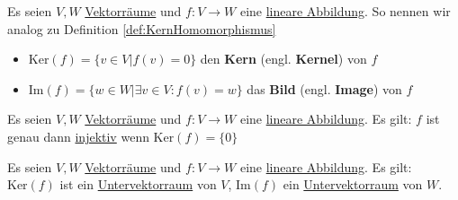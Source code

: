 \documentclass[../../main.tex]{subfiles}
\begin{document}
	\begin{definition}
		\label{def:KernelLineareAbbildung}
		\label{def:KernLineareAbbildung}
		\label{def:ImageLineareAbbildung}
		\label{def:BildLineareAbbildung}
		Es seien $V, W$ \hyperref[def:Vektorraum]{Vektorräume} und $f: V \rightarrow W$ eine \hyperref[def:LineareAbbildung]{lineare Abbildung}. So nennen wir analog zu Definition \ref{def:KernHomomorphismus}
		\begin{itemize}
			\item $\textrm{Ker}(f) = \{ v \in V | f(v) = 0 \}$ den \textbf{Kern} (engl. \textbf{Kernel}) von $f$
			\item $\textrm{Im}(f) = \{ w \in W | \exists v \in V: f(v)=w \}$ das \textbf{Bild} (engl. \textbf{Image}) von $f$
		\end{itemize}
	\end{definition}
	
	\begin{theorem}
		Es seien $V, W$ \hyperref[def:Vektorraum]{Vektorräume} und $f: V \rightarrow W$ eine \hyperref[def:LineareAbbildung]{lineare Abbildung}. Es gilt: $f$ ist genau dann \hyperref[def:Injektiv]{injektiv} wenn $\textrm{Ker}(f)=\{0\}$
	\end{theorem}

	\begin{theorem}
		Es seien $V, W$ \hyperref[def:Vektorraum]{Vektorräume} und $f: V \rightarrow W$ eine \hyperref[def:LineareAbbildung]{lineare Abbildung}. Es gilt: $\textrm{Ker}(f)$ ist ein \hyperref[def:Untervektorraum]{Untervektorraum} von $V$, $\textrm{Im}(f)$ ein \hyperref[def:Untervektorraum]{Untervektorraum} von $W$. 
	\end{theorem}
	
\end{document}
